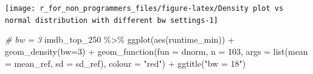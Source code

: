\documentclass[
]{book}
\newenvironment{Shaded}{\begin{snugshade}}{\end{snugshade}}
\newcommand{\AttributeTok}[1]{\textcolor[rgb]{0.77,0.63,0.00}{#1}}
\newcommand{\CommentTok}[1]{\textcolor[rgb]{0.56,0.35,0.01}{\textit{#1}}}
\newcommand{\DecValTok}[1]{\textcolor[rgb]{0.00,0.00,0.81}{#1}}
\newcommand{\FunctionTok}[1]{\textcolor[rgb]{0.00,0.00,0.00}{#1}}
\newcommand{\NormalTok}[1]{#1}
\newcommand{\OtherTok}[1]{\textcolor[rgb]{0.56,0.35,0.01}{#1}}
\newcommand{\SpecialCharTok}[1]{\textcolor[rgb]{0.00,0.00,0.00}{#1}}
\newcommand{\StringTok}[1]{\textcolor[rgb]{0.31,0.60,0.02}{#1}}
\begin{document}
\begin{Shaded}
\end{Shaded}

\begin{center}\texttt{[image: r\_for\_non\_programmers\_files/figure-latex/Density plot vs normal distribution with different bw settings-1]} \end{center}

\begin{Shaded}
\begin{Highlighting}[]

\CommentTok{\# bw = 3}
\NormalTok{imdb\_top\_250 }\SpecialCharTok{\%\textgreater{}\%} 
  \FunctionTok{ggplot}\NormalTok{(}\FunctionTok{aes}\NormalTok{(runtime\_min)) }\SpecialCharTok{+}
  \FunctionTok{geom\_density}\NormalTok{(}\AttributeTok{bw=}\DecValTok{3}\NormalTok{) }\SpecialCharTok{+}
  \FunctionTok{geom\_function}\NormalTok{(}\AttributeTok{fun =}\NormalTok{ dnorm,}
                \AttributeTok{n =} \DecValTok{103}\NormalTok{,}
                \AttributeTok{args =} \FunctionTok{list}\NormalTok{(}\AttributeTok{mean =}\NormalTok{ mean\_ref,}
                            \AttributeTok{sd =}\NormalTok{ sd\_ref),}
                \AttributeTok{colour =} \StringTok{"red"}\NormalTok{) }\SpecialCharTok{+}
    \FunctionTok{ggtitle}\NormalTok{(}\StringTok{"bw = 18"}\NormalTok{)}
\end{Highlighting}
\end{Shaded}
\end{document}
